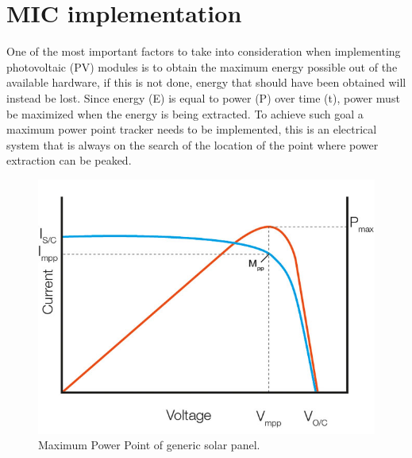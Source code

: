 \section{MIC implementation}
One of the most important factors to take into consideration when implementing photovoltaic (PV) modules is to obtain the maximum energy possible out of the available hardware, if this is not done, energy that should have been obtained will instead be lost. Since energy (E) is equal to power (P) over time (t), power must be maximized when the energy is being extracted. To achieve such goal a maximum power point tracker needs to be implemented, this is an electrical system that is always on the search of the location of the point where power extraction can be peaked. 
\begin{figure}[htbp]
	\begin{center}
	\includegraphics[width=0.6\linewidth]{../Pictures/mpp_graph.jpg}
	\caption{Maximum Power Point of generic solar panel.}
	\label{fig:mpp}
	\end{center}
\end{figure}


